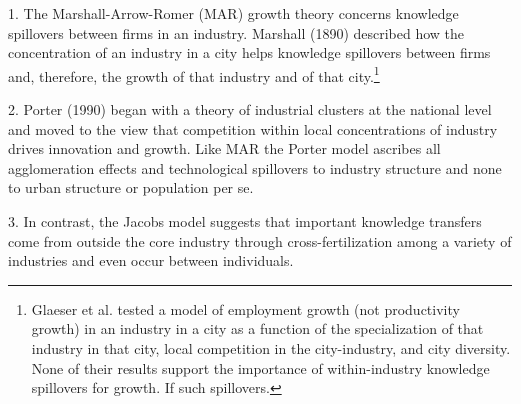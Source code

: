 
1. The Marshall-Arrow-Romer (MAR) growth theory concerns knowledge spillovers between firms in an industry.  Marshall (1890) described how the concentration of an industry in a city helps knowledge spillovers between firms and, therefore, the growth of that industry and of that city.\footnote{Glaeser et al. \cite{glaeserGrowthCities1991} tested a model of employment growth (not productivity growth) in an industry in a city as a function of the specialization of that industry in that city, local competition in the city-industry, and city diversity. None of their results support the importance of within-industry knowledge spillovers for growth. If such spillovers. %
}

2. Porter (1990) began with a theory of industrial clusters at the national level and moved to the view that competition within local concentrations of industry drives innovation and growth. Like MAR the Porter model ascribes all agglomeration effects and technological spillovers to industry structure and none to urban structure or population per se.  

3. In contrast, the \gls{Jacobs model} %
suggests that important knowledge transfers come from outside the core industry through cross-fertilization among a variety of industries and even occur between individuals.

